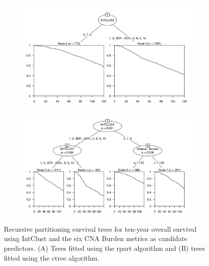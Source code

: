 \begin{figure}[!htb]
\centering

\vspace{0.5cm}

\begin{subfigure}{\textwidth}
\subcaption{}
\includegraphics[width=1\textwidth]{../figures/Appendices/Appendix_B/PartyKit_Survival_Burden_TenYearOS_INTCLUST.png}
\end{subfigure}

\vspace{2cm}

\begin{subfigure}{\textwidth}
\subcaption{}
\includegraphics[width=1\textwidth]{../figures/Appendices/Appendix_B/Ctree_Survival_Burden_TenYearOS_INTCLUST.png}
\end{subfigure}

\vspace{0.5cm}

\caption[Recursive partitioning survival trees for ten-year overall survival using IntClust and the six CNA Burden metrics as candidate predictors.]{Recursive partitioning survival trees for ten-year overall survival using IntClust and the six CNA Burden metrics as candidate predictors. (A) Trees fitted using the rpart algorithm and (B) trees fitted using the ctree algorithm.}
\end{figure}

